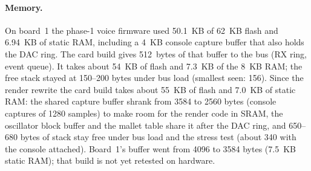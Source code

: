 \documentclass[11pt,a4paper]{article}
\begin{document}
\paragraph{Memory.} On board~1 the phase-1 voice firmware used \SI{50.1}{KB} of \SI{62}{KB} flash and \SI{6.94}{KB}
of static RAM, including a \SI{4}{KB} console capture buffer that also holds the DAC ring. The card build gives
\SI{512}{bytes} of that buffer to the bus (RX ring, event queue). It takes about \SI{54}{KB} of flash and
\SI{7.3}{KB} of the \SI{8}{KB} RAM; the free stack stayed at 150--200 bytes under bus load (smallest seen: 156).
Since the render rewrite the card build takes about \SI{55}{KB} of flash and \SI{7.0}{KB} of static RAM: the shared
capture buffer shrank from 3584 to 2560 bytes (console captures of 1280 samples) to make room for the render code in
SRAM, the oscillator block buffer and the mallet table share it after the DAC ring, and 650--680 bytes of stack stay
free under bus load and the stress test (about 340 with the console attached). Board~1's buffer went from 4096 to
3584 bytes (\SI{7.5}{KB} static RAM); that build is not yet retested on hardware.
\end{document}
